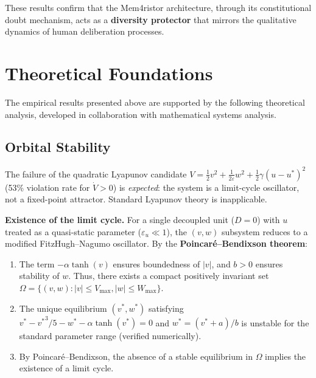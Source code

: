 \documentclass[11pt]{article}
\begin{document}
These results confirm that the Mem4ristor architecture, through its constitutional doubt mechanism, acts as a \textbf{diversity protector} that mirrors the qualitative dynamics of human deliberation processes.

\section{Theoretical Foundations}

The empirical results presented above are supported by the following theoretical analysis, developed in collaboration with mathematical systems analysis.

\subsection{Orbital Stability}

The failure of the quadratic Lyapunov candidate $V = \frac{1}{2}v^2 + \frac{1}{2\varepsilon}w^2 + \frac{1}{2}\gamma(u-u^*)^2$ (53\% violation rate for $\dot{V} > 0$) is \emph{expected}: the system is a limit-cycle oscillator, not a fixed-point attractor. Standard Lyapunov theory is inapplicable.

\textbf{Existence of the limit cycle.} For a single decoupled unit ($D=0$) with $u$ treated as a quasi-static parameter ($\varepsilon_u \ll 1$), the $(v,w)$ subsystem reduces to a modified FitzHugh--Nagumo oscillator. By the \textbf{Poincar\'e--Bendixson theorem}:
\begin{enumerate}
    \item The term $-\alpha\tanh(v)$ ensures boundedness of $|v|$, and $b > 0$ ensures stability of $w$. Thus, there exists a compact positively invariant set $\Omega = \{(v,w) : |v| \le V_{\max}, |w| \le W_{\max}\}$.
    \item The unique equilibrium $(v^*, w^*)$ satisfying $v^* - {v^*}^3/5 - w^* - \alpha\tanh(v^*) = 0$ and $w^* = (v^* + a)/b$ is unstable for the standard parameter range (verified numerically).
    \item By Poincar\'e--Bendixson, the absence of a stable equilibrium in $\Omega$ implies the existence of a limit cycle.
\end{enumerate}
\end{document}
